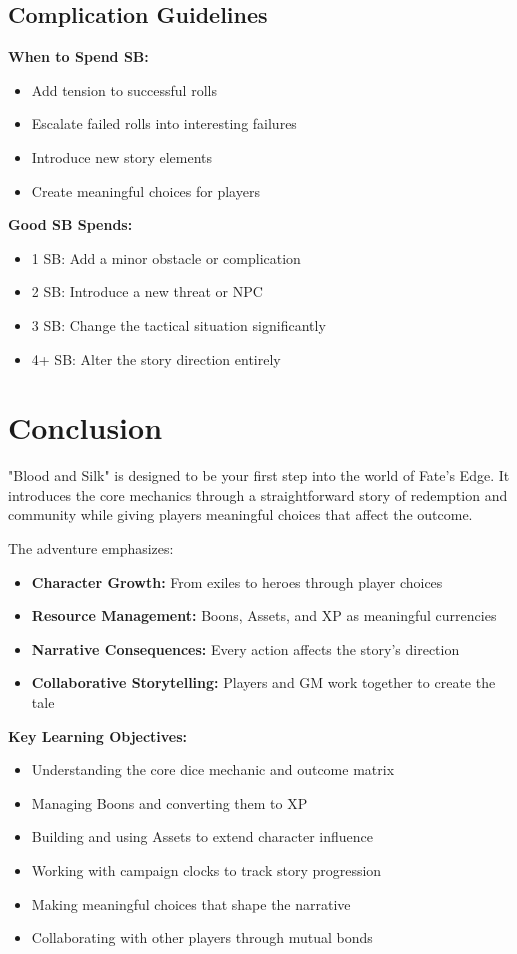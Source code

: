 \documentclass[11pt]{article}
\begin{document}
\subsection{Complication Guidelines}

\textbf{When to Spend SB:}
\begin{itemize}
\item Add tension to successful rolls
\item Escalate failed rolls into interesting failures
\item Introduce new story elements
\item Create meaningful choices for players
\end{itemize}

\textbf{Good SB Spends:}
\begin{itemize}
\item 1 SB: Add a minor obstacle or complication
\item 2 SB: Introduce a new threat or NPC
\item 3 SB: Change the tactical situation significantly
\item 4+ SB: Alter the story direction entirely
\end{itemize}

\section{Conclusion}

"Blood and Silk" is designed to be your first step into the world of Fate's Edge. It introduces the core mechanics through a straightforward story of redemption and community while giving players meaningful choices that affect the outcome.

The adventure emphasizes:
\begin{itemize}
\item \textbf{Character Growth:} From exiles to heroes through player choices
\item \textbf{Resource Management:} Boons, Assets, and XP as meaningful currencies
\item \textbf{Narrative Consequences:} Every action affects the story's direction
\item \textbf{Collaborative Storytelling:} Players and GM work together to create the tale
\end{itemize}

\textbf{Key Learning Objectives:}
\begin{itemize}
\item Understanding the core dice mechanic and outcome matrix
\item Managing Boons and converting them to XP
\item Building and using Assets to extend character influence
\item Working with campaign clocks to track story progression
\item Making meaningful choices that shape the narrative
\item Collaborating with other players through mutual bonds
\end{itemize}
\end{document}
